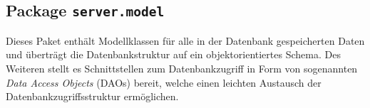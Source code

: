 \FloatBarrier
 \subsection[Package server.model]{Package \texttt{server.model}}
Dieses Paket enthält Modellklassen für alle in der Datenbank gespeicherten Daten und überträgt die Datenbankstruktur auf ein objektorientiertes Schema. Des Weiteren stellt es Schnittstellen zum Datenbankzugriff in Form von sogenannten \emph{Data Access Objects} (DAOs) bereit, welche einen leichten Austausch der Datenbankzugriffsstruktur ermöglichen.


 
